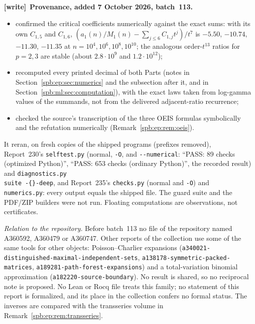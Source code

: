 \documentclass[11pt,letterpaper]{article}
\numberwithin{equation}{section}
\theoremstyle{definition}\newtheorem{definition}[theorem]{Definition}
\theoremstyle{remark}\newtheorem{remark}[theorem]{Remark}
\newcommand{\E}{\mathbb E}
\newcommand{\1}{\mathbf 1}
\newcommand{\file}[1]{\nolinkurl{#1}}
\newenvironment{writenote}[1][]{\par\smallskip\begingroup\small
 \noindent\textbf{[write]}\if\relax\detokenize{#1}\relax\else~\textbf{#1.}\fi\ }%
 {\par\endgroup\smallskip}
\begin{document}
\begin{writenote}[Provenance, added 7 October 2026, batch~113]
\begin{itemize}
Section~\ref{spb:ml:sec:binomial}.3, the signed moment
identities~\eqref{spb:ml:eq:signedmoments} for $M\le8$, and the Gaussian
constants~\eqref{spb:ml:eq:H3norm}, $\E|Z^2-1|=4\phi(1)$, the median and
$\E|W-m|=m$ of Lemma~\ref{spb:ml:lem:median} (with $J$ evaluated numerically
at and around its minimizer);
\item confirmed the critical coefficients numerically against the exact sums:
with its own $C_{1,5}$ and $C_{1,6}$, $(a_1(n)/M_1(n)-\sum_{j\le6}C_{1,j}t^j)/t^7$
is $-5.50$, $-10.74$, $-11.30$, $-11.35$ at $n=10^4,10^6,10^8,10^{10}$; the
analogous order-$t^{13}$ ratios for $p=2,3$ are stable (about $2.8\cdot10^9$
and $1.2\cdot10^{12}$);
\item recomputed every printed decimal of both Parts (notes in
Section~\ref{spb:ep:sec:numerics} and the subsection after it, and in
Section~\ref{spb:ml:sec:computation}), with the exact laws taken from log-gamma
values of the summands, not from the delivered adjacent-ratio recurrence;
\item checked the source's transcription of the three OEIS formulas
symbolically and the refutation numerically (Remark~\ref{spb:ep:rem:oeis}).
\end{itemize}
It reran, on fresh copies of the shipped programs (prefixes removed),
Report~230's \file{selftest.py} (normal, \texttt{-O}, and
\texttt{-{}-numerical}: ``PASS: 89 checks (optimized Python)'', ``PASS: 653
checks (ordinary Python)'', the recorded result) and \file{diagnostics.py
suite -{}-deep}, and Report~235's \file{checks.py} (normal and \texttt{-O})
and \file{numerics.py}: every output equals the shipped file. The guard suite
and the PDF/ZIP builders were not run. Floating computations are observations,
not certificates.

\emph{Relation to the repository.} Before batch~113 no file of the repository
named A360592, A360479 or A360747. Other reports of the collection use some of
the same tools for other objects: Poisson--Charlier expansions
(\file{a340021-distinguished-maximal-independent-sets},
\file{a138178-symmetric-packed-matrices}, \file{a189281-path-forest-expansions})
and a total-variation binomial approximation
(\file{a182220-source-boundary}). No result is shared, so no reciprocal note is
proposed. No Lean or Rocq file treats this family; no statement of this report
is formalized, and its place in the collection confers no formal status. The
inverses are compared with the transseries volume in
Remark~\ref{spb:ep:rem:transseries}.
\end{writenote}
\end{document}
